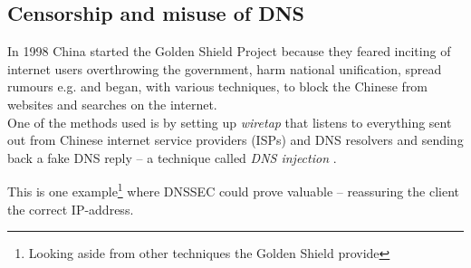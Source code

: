 \documentclass[Main]{subfiles}
\begin{document}
\subsection{Censorship and misuse of DNS}


In 1998 China started the Golden Shield Project because they feared inciting of internet users overthrowing the government, harm national unification, spread rumours e.g.\cite{GFW-avoid} and began, with various techniques, to block the Chinese from websites and searches on the internet.
\\
One of the methods used is by setting up \textit{wiretap} that listens to everything sent out from Chinese internet service providers (ISPs) and DNS resolvers and sending back a fake DNS reply -- a technique called \textit{DNS injection} \cite{GFW}. 


This is one example\footnote{Looking aside from other techniques the Golden Shield provide} where DNSSEC could prove valuable -- reassuring the client the correct IP-address.
\end{document}

